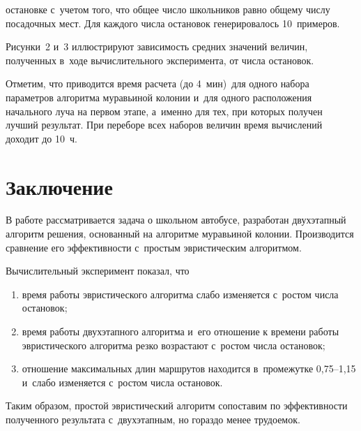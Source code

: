 \begin{multicols}{2}

\noindent
остановке с~учетом того, что общее число школьников равно общему чис\-лу
посадочных мест. Для каждого
чис\-ла остановок генерировалось 10~примеров.
{

}

     Рисунки~2 и~3 иллюстрируют зависимость средних значений величин,
полученных в~ходе вы\-чис\-ли\-тельного эксперимента, от числа остановок.
     	

     Отметим, что приводится время расчета (до 4~мин)\ для одного набора
параметров алгоритма муравьиной колонии и~для одного расположения
начального луча на первом этапе, а~именно для тех, при которых получен
лучший результат. При переборе всех наборов величин время вычислений
доходит до 10~ч.

\vspace*{-14pt}


    \section{Заключение}

    \vspace*{-4pt}

В работе рассматривается задача о школьном автобусе, разработан
двухэтапный алгоритм решения, основанный на алгоритме муравьиной
колонии. Производится сравнение его эффективности с~простым
эвристическим алгоритмом.

	Вычислительный эксперимент показал, что
\begin{enumerate}[(1)]
\item время работы эвристического алгоритма слабо
изменяется с~ростом числа остановок;
\item время работы двухэтапного алгоритма и~его отношение к времени
работы эвристического алгоритма резко возрастают с~ростом числа остановок;
\item отношение максимальных длин маршрутов находится в~промежутке
0,75--1,15 и~слабо изменяется с~ростом числа остановок.
\end{enumerate}

Таким образом, простой эвристический алгоритм сопоставим по
эффективности полученного результата с~двухэтапным, но гораздо менее
трудоемок.

\vspace*{-9pt}


\end{multicols}
